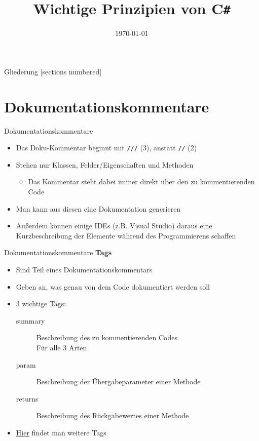 



\title{Wichtige Prinzipien von C\texttt{\#}}
\date{\today}




\maketitle

\begin{frame}{Gliederung}
	[sections numbered]
	\tableofcontents
\end{frame}


\section{Dokumentationskommentare}
\begin{frame}{Dokumentationskommentare}
	\begin{itemize}
		\item Das Doku-Kommentar beginnt mit \texttt{\alert{///}} (3), anstatt \texttt{\alert{//}} (2)
		\item Stehen nur Klassen, Felder/Eigenschaften und Methoden
		\begin{itemize}
			\item Das Kommentar steht dabei immer direkt über den zu kommentierenden Code
		\end{itemize}
		\item Man kann aus diesen eine Dokumentation generieren
		\item Außerdem können einige IDEs (z.B. Visual Studio) daraus eine Kurzbeschreibung der Elemente während des Programmierens schaffen		
	\end{itemize}
\end{frame}

\begin{frame}{Dokumentationskommentare}
	\textbf{Tags}
	\begin{itemize}
		\item Sind Teil eines Dokumentationskommentars
		\item Geben an, was genau von dem Code dokumentiert werden soll
		\item 3 wichtige Tags:
		\begin{description}
			\item[summary] Beschreibung des zu kommentierenden Codes\\ Für alle 3 Arten
			\item[param] Beschreibung der Übergabeparameter einer Methode
			\item[returns] Beschreibung des Rückgabewertes einer Methode
		\end{description}
		\item \href{https://msdn.microsoft.com/de-de/library/5ast78ax.aspx}{\alert{Hier}} findet man weitere Tags
	\end{itemize}
\end{frame}


